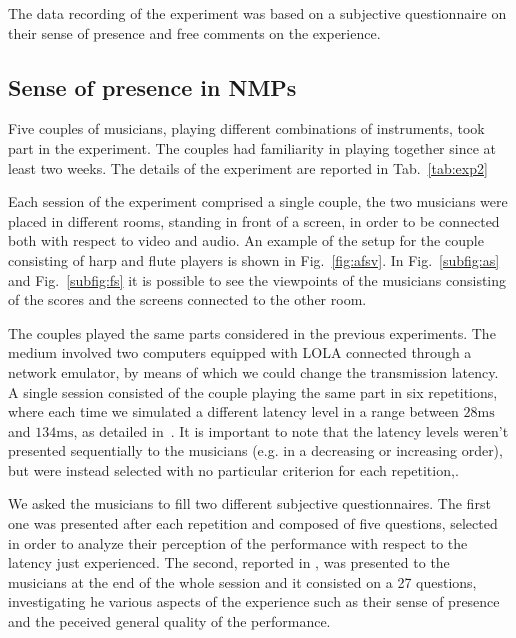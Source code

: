 The data recording of the experiment was based on a subjective questionnaire on their sense of presence and free comments on the experience. 





\subsection{Sense of presence in NMPs}
Five couples of musicians, playing different combinations of instruments, took part in the experiment. The couples had familiarity in playing together since at least two weeks. The details of the experiment are reported in Tab.~\ref{tab:exp2}

Each session of the experiment comprised a single couple, the two musicians were placed in different rooms, standing in front of a screen, in order to be connected both with respect to video and audio. An example of the setup for the couple consisting of harp and flute players is shown in Fig.~\ref{fig:afsv}. In Fig.~\ref{subfig:as} and Fig.~\ref{subfig:fs} it is possible to see the viewpoints of the musicians consisting of the scores and the screens connected to the other room. 

The couples played the same parts considered in the previous experiments. The medium involved two computers equipped with LOLA connected through a network emulator, by means of which we could change the transmission latency. A single session consisted of the couple playing the same part in six repetitions, where each time we simulated a different latency level in a range between $28\mathrm{ms}$ and $134\mathrm{ms}$, as detailed in~\cite{CIM2018}. It is important to note that the latency levels weren't presented sequentially to the musicians (e.g. in a decreasing or increasing order), but were instead selected with no particular criterion for each repetition,.

We asked the musicians to fill two different subjective questionnaires. The first one was presented after each repetition and composed of five questions, selected in order to analyze their perception of the performance with respect to the latency just experienced. The second, reported in \cite{CIM2018}, was presented to the musicians at the end of the whole session and it consisted on a 27 questions, investigating he various aspects of the experience such as their sense of presence and the peceived general quality of the performance.



